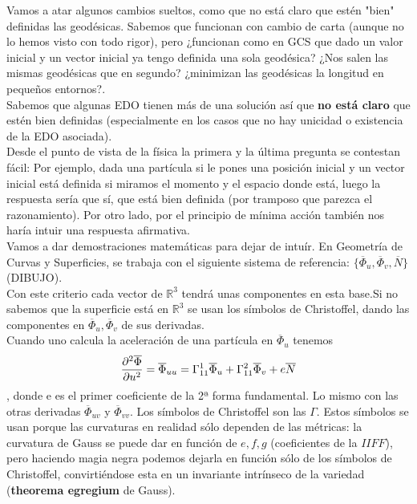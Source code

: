 \documentclass[palatino, bibnumbers]{apuntes}
\begin{document}
Vamos a atar algunos cambios sueltos, como que no está claro que estén "bien" definidas las geodésicas. Sabemos que funcionan con cambio de carta (aunque no lo hemos visto con todo rigor), pero ¿funcionan como en GCS que dado un valor inicial y un vector inicial ya tengo definida una sola geodésica? ¿Nos salen las mismas geodésicas que en segundo? ¿minimizan las geodésicas la longitud en pequeños entornos?.\\ \indent Sabemos que algunas EDO tienen más de una solución así que \textbf{no está claro} que estén bien definidas (especialmente en los casos que no hay unicidad o existencia de la EDO asociada). \\ \indent Desde el punto de vista de la física la primera y la última pregunta se contestan fácil: Por ejemplo, dada una partícula si le pones una posición inicial y un vector inicial está definida si miramos el momento y el espacio donde está, luego la respuesta sería que sí, que está bien definida (por tramposo que parezca el razonamiento). Por otro lado, por el principio de mínima acción también nos haría intuir una respuesta afirmativa.\\
\indent Vamos a dar demostraciones matemáticas para dejar de intuír. En Geometría de Curvas y Superficies, se trabaja con el siguiente sistema de referencia: $\{\overline{\Phi}_u,\overline{\Phi}_v,\overline{N}\}$ (DIBUJO).\\ \indent Con este criterio cada vector de $\mathbb{R}^3$ tendrá unas componentes en esta base.Si no sabemos que la superficie está en $\mathbb{R}^3$ se usan los símbolos de Christoffel, dando las componentes en $\overline{\Phi}_u,\overline{\Phi}_v$ de sus derivadas.\\
\indent Cuando uno calcula la aceleración de una partícula en $\overline{\Phi}_u$ tenemos $$\pdv[2]{\overline{\Phi}}{u}=\overline{\Phi}_{uu}=\Gamma^1_{11}\overline{\Phi}_u+\Gamma^2_{11}\overline{\Phi}_v+e\overline{N}$$, donde e es el primer coeficiente de la 2ª forma fundamental. Lo mismo con las otras derivadas $\overline{\Phi}_{uv}$ y $\overline{\Phi}_{vv}$. Los símbolos de Christoffel son las $\Gamma$. Estos símbolos se usan porque las curvaturas en realidad sólo dependen de las métricas: la curvatura de Gauss se puede dar en función de $e,f,g$ (coeficientes de la $II FF$), pero haciendo magia negra podemos dejarla en función sólo de los símbolos de Christoffel, convirtiéndose esta en un invariante intrínseco de la variedad (\textbf{theorema egregium} de Gauss).
\end{document}
